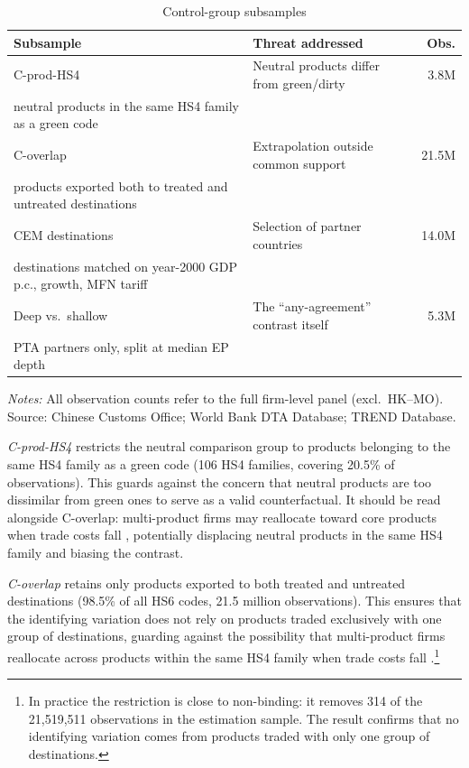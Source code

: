 \documentclass[12pt]{article}
\begin{document}
\begin{table}[htbp]
\centering
\caption{Control-group subsamples}
\label{tab:samples}
\small
\begin{threeparttable}
\begin{tabular}{llr}
\toprule
Subsample & Threat addressed & Obs. \\
\midrule
C-prod-HS4 & Neutral products differ from green/dirty & 3.8M \\
\quad neutral products in the same HS4 family as a green code & & \\
\addlinespace
C-overlap & Extrapolation outside common support & 21.5M \\
\quad products exported both to treated and untreated destinations & & \\
\addlinespace
CEM destinations & Selection of partner countries & 14.0M \\
\quad destinations matched on year-2000 GDP p.c., growth, MFN tariff & & \\
\addlinespace
Deep vs.\ shallow & The ``any-agreement'' contrast itself & 5.3M \\
\quad PTA partners only, split at median EP depth & & \\
\bottomrule
\end{tabular}
\begin{tablenotes}\footnotesize
\item \emph{Notes:} All observation counts refer to the full firm-level panel (excl.\ HK--MO). Source: Chinese Customs Office; World Bank DTA Database; TREND Database.
\end{tablenotes}
\end{threeparttable}
\end{table}

\emph{C-prod-HS4} restricts the neutral comparison group to products belonging to the
same HS4 family as a green code (106 HS4 families, covering 20.5\% of observations).
This guards against the concern that neutral products are too dissimilar from green ones
to serve as a valid counterfactual. It should be read alongside C-overlap: multi-product
firms may reallocate toward core products when trade costs fall \citep{eckel2010},
potentially displacing neutral products in the same HS4 family and biasing the contrast.

\emph{C-overlap} retains only products exported to both treated and untreated destinations (98.5\% of all HS6 codes, 21.5 million observations). This ensures that the identifying variation does not rely on products traded exclusively with one group of destinations, guarding against the possibility that multi-product firms reallocate across products within the same HS4 family when trade costs fall \citep{eckel2010}.\footnote{In practice the restriction is close to non-binding: it removes 314 of the 21{,}519{,}511 observations in the estimation sample. The result confirms that no identifying variation comes from products traded with only one group of destinations.}
\end{document}
